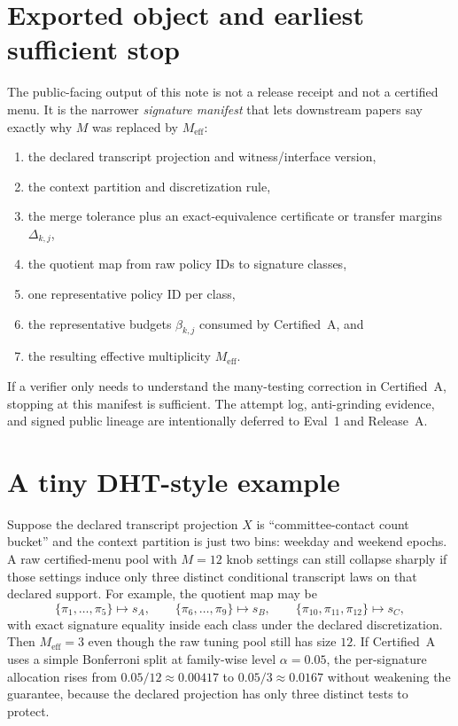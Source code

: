 \documentclass[11pt]{article}
\begin{document}
\section{Exported object and earliest sufficient stop}
The public-facing output of this note is not a release receipt and not a certified menu.
It is the narrower \emph{signature manifest} that lets downstream papers say exactly why $M$ was replaced by $M_{\mathrm{eff}}$:
\begin{enumerate}[leftmargin=*]
\item the declared transcript projection and witness/interface version,
\item the context partition and discretization rule,
\item the merge tolerance plus an exact-equivalence certificate or transfer margins $\Delta_{k,j}$,
\item the quotient map from raw policy IDs to signature classes,
\item one representative policy ID per class,
\item the representative budgets $\beta_{k,j}$ consumed by Certified~A, and
\item the resulting effective multiplicity $M_{\mathrm{eff}}$.
\end{enumerate}
If a verifier only needs to understand the many-testing correction in Certified~A, stopping at this manifest is sufficient.
The attempt log, anti-grinding evidence, and signed public lineage are intentionally deferred to Eval~1 and Release~A.\cite{series:eval1,series:releaseA}

\section{A tiny DHT-style example}
Suppose the declared transcript projection $X$ is ``committee-contact count bucket'' and the context partition is just two bins: weekday and weekend epochs.
A raw certified-menu pool with $M=12$ knob settings can still collapse sharply if those settings induce only three distinct conditional transcript laws on that declared support.
For example, the quotient map may be
\[
\{\pi_1,\ldots,\pi_5\}\mapsto s_A,\qquad
\{\pi_6,\ldots,\pi_9\}\mapsto s_B,\qquad
\{\pi_{10},\pi_{11},\pi_{12}\}\mapsto s_C,
\]
with exact signature equality inside each class under the declared discretization.
Then $M_{\mathrm{eff}}=3$ even though the raw tuning pool still has size $12$.
If Certified~A uses a simple Bonferroni split at family-wise level $\alpha=0.05$, the per-signature allocation rises from $0.05/12\approx 0.00417$ to $0.05/3\approx 0.0167$ without weakening the guarantee, because the declared projection has only three distinct tests to protect.
\end{document}
